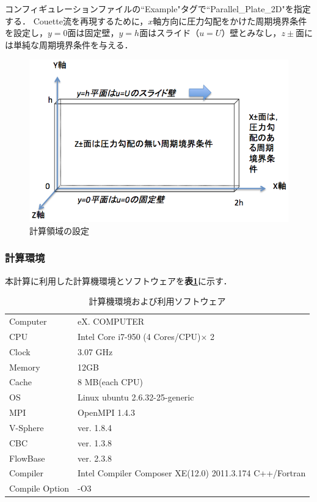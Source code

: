 コンフィギュレーションファイルの``Example"タグで``Parallel\_Plate\_2D"を指定する．
Couette流を再現するために，$x$軸方向に圧力勾配をかけた周期境界条件を設定し，$y=0$面は固定壁，$y=h$面はスライド（$u=U$）壁とみなし，$z\pm$面には単純な周期境界条件を与える．

\begin{figure}[htbp]
\centering
\includegraphics[width=12cm, bb=0 0 646 405]{2Dcouette_model.png}
\caption{計算領域の設定}
\label{Fig.couetteP}
\end{figure}

\pagebreak
\subsubsection{計算環境}
本計算に利用した計算機環境とソフトウェアを\textbf{表\ref{tbl: 2dcouette env}}に示す．

\begin{table}[htdp]
\small
\caption{計算機環境および利用ソフトウェア}
\begin{center}
\begin{tabular}{ll}\toprule
Computer & eX. COMPUTER\\
CPU & Intel Core i7-950 (4 Cores/CPU)$\times$ 2\\
Clock & 3.07 GHz\\
Memory & 12GB \\
Cache & 8 MB(each CPU)\\
OS & Linux ubuntu 2.6.32-25-generic\\ \hline
MPI & OpenMPI 1.4.3\\
V-Sphere & ver. 1.8.4\\
CBC & ver. 1.3.8\\
FlowBase & ver. 2.3.8\\ \hline
Compiler & Intel Compiler Composer XE(12.0) 2011.3.174 C++/Fortran\\
Compile Option & -O3\\
\bottomrule
\end{tabular}
\end{center}
\label{tbl: 2dcouette env}
\end{table}


